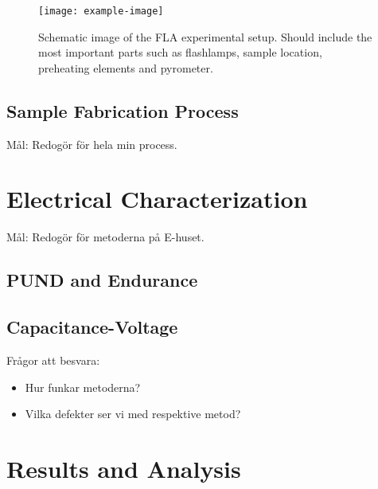 \documentclass[11pt,twoside]{eitExjobb}
\begin{document}
\begin{figure}
    \centering
    \texttt{[image: example-image]}
    \caption{Schematic image of the FLA experimental setup. Should include the
    most important parts such as flashlamps, sample location, preheating
    elements and pyrometer.}\label{fig:fab_FLAsetup}
\end{figure}

\section{Sample Fabrication Process}\label{sec:FabProc}

Mål: Redogör för hela min process.

\chapter{Electrical Characterization}\label{ch:char}

Mål: Redogör för metoderna på E-huset.

\section{PUND and Endurance}\label{sec:PandE}

\section{Capacitance-Voltage}

Frågor att besvara: 
\begin{itemize}
    \item Hur funkar metoderna? 
    \item Vilka defekter ser vi med respektive metod? 
\end{itemize}

\chapter{Results and Analysis}\label{ch:res}
\end{document}
